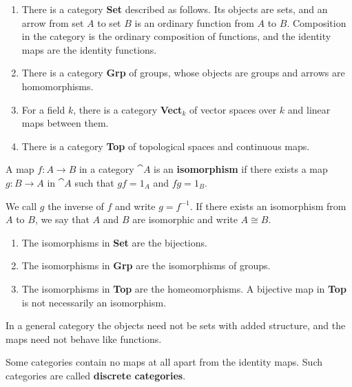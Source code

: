 \documentclass[11pt,a4paper]{article}
\begin{document}
\begin{example}\leavevmode
    \begin{enumerate}[label=(\alph*)]
        \item There is a category \textbf{Set} described as follows. Its objects are sets, and an arrow from set $A$ to set $B$ is an ordinary function from $A$ to $B$. Composition in the category is the ordinary composition of functions, and the identity maps are the identity functions.
        \item There is a category \textbf{Grp} of groups, whose objects are groups and arrows are homomorphisms.
        \item For a field $k$, there is a category \textbf{Vect$_k$} of vector spaces over $k$ and linear maps between them.
        \item There is a category \textbf{Top} of topological spaces and continuous maps.
    \end{enumerate}
\end{example}

\begin{definition}
    A map $f: A\to B$ in a category $\cat{A}$ is an \textbf{isomorphism} if there exists a map $g: B \to A$ in $\cat{A}$ such that $gf=1_A$ and $fg=1_B$.
\end{definition}
We call $g$ the inverse of $f$ and write $g=f^{-1}$. If there exists an isomorphism from $A$ to $B$, we say that $A$ and $B$ are isomorphic and write $A \cong B$. 

\begin{example}[Categories]\leavevmode
    \begin{enumerate}[label=(\alph*)]
        \item The isomorphisms in \textbf{Set} are the bijections. 
        \item The isomorphisms in \textbf{Grp} are the isomorphisms of groups.
        \item The isomorphisms in \textbf{Top} are the homeomorphisms. A bijective map in \textbf{Top} is not necessarily an isomorphism.
    \end{enumerate}
\end{example}

In a general category the objects need not be sets with added structure, and the maps need not behave like functions.

Some categories contain no maps at all apart from the identity maps. Such categories are called \textbf{discrete categories}.
\end{document}
